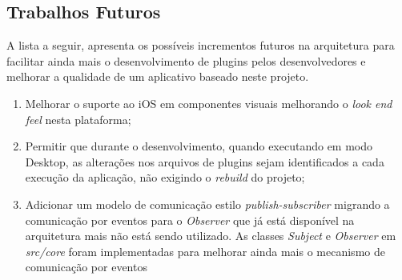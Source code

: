 \subsection{Trabalhos Futuros}
A lista a seguir, apresenta os possíveis incrementos futuros na arquitetura para facilitar ainda mais o desenvolvimento de plugins pelos desenvolvedores e melhorar a qualidade de um aplicativo baseado neste projeto.

\begin{enumerate}
	\item Melhorar o suporte ao iOS em componentes visuais melhorando o \textit{look end feel} nesta plataforma;

	\item Permitir que durante o desenvolvimento, quando executando em modo Desktop, as alterações nos arquivos de plugins sejam identificados a cada execução da aplicação, não exigindo o \textit{rebuild} do projeto;

	\item Adicionar um modelo de comunicação estilo \textit{publish-subscriber} migrando a comunicação por eventos para o \textit{Observer} que já está disponível na arquitetura mais não está sendo utilizado. As classes \textit{Subject} e \textit{Observer} em \textit{src/core} foram implementadas para melhorar ainda mais o mecanismo de comunicação por eventos
\end{enumerate}
